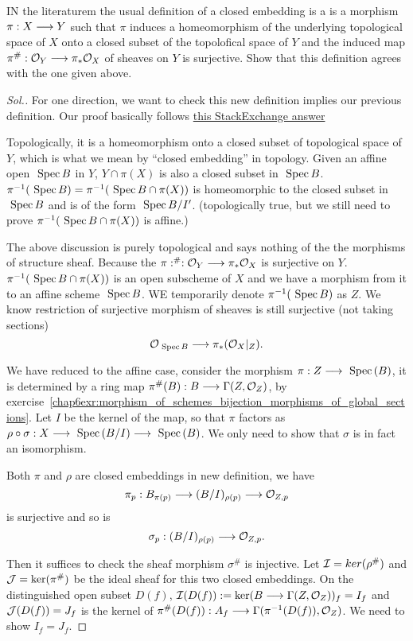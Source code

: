 \documentclass[11pt]{book} %
\begin{document}
\begin{exr} 
IN the literaturem the usual definition of a closed embedding is a is a morphism $\pi:X\longrightarrow Y$ such that $\pi$ induces a homeomorphism of the underlying topological space of $X$ onto a closed subset of the topolofical space of $Y$ and the induced map $\pi^\#:{\cal O}_Y\longrightarrow \pi_*{\cal O}_X$ of sheaves on $Y$ is surjective. Show that this definition agrees with the one given above.
\end{exr}
\begin{proof}[Sol.]
For one direction, we want to check this new definition implies our previous definition. Our proof basically follows \href{https://math.stackexchange.com/a/1722514/286862}{this StackExchange answer}

Topologically, it is a homeomorphism onto a closed subset of topological space of $Y$, which is what we mean by ``closed embedding'' in topology. Given an affine open $\text{ Spec\,} B$ in $Y$, $Y\cap \pi(X)$ is also a closed subset in $\text{ Spec\,} B$.  $\pi^{-1}(\text{ Spec\,} B)=\pi^{-1}(\text{ Spec\,} B\cap \pi(X))$ is homeomorphic to the closed subset in $\text{ Spec\,} B$ and is of the form $\text{ Spec\,} B/I'$. (topologically true, but we still need to prove $\pi^{-1}(\text{ Spec\,} B\cap \pi(X))$ is affine.)

The above discussion is purely topological and says nothing of the the morphisms of structure sheaf. Because the $\pi:^\#:{\cal O}_Y\longrightarrow \pi_*{\cal O}_X$ is surjective on $Y$.  $\pi^{-1}(\text{ Spec\,} B\cap \pi(X))$ is an open subscheme of $X$ and we have a morphism from it to an affine scheme $\text{ Spec\,} B$. WE temporarily denote $\pi^{-1}(\text{ Spec\,} B)$ as $Z$. We know restriction of surjective morphism  of sheaves is still surjective (not taking sections)
$$
{\cal O}_{\text{ Spec\,} B}\longrightarrow \pi_*({\cal O}_{X}|_{Z}).
$$ 

We have reduced to the affine case, consider the morphism $\pi:Z\longrightarrow \text{ Spec\,}(B)$, it is determined by a ring map $\pi^\#(B):B\longrightarrow \Gamma(Z,{\cal O}_Z)$, by exercise~\ref{chap6exr:morphism_of_schemes_bijection_morphisms_of_global_sections}. Let $I$ be the kernel of the map, so that $\pi$ factors as $\rho\circ \sigma:X\longrightarrow\text{ Spec\,}(B/I)\longrightarrow \text{ Spec\,}(B)$. We only need to show that $\sigma$ is in fact an isomorphism. 

Both $\pi$ and $\rho$ are closed embeddings in new definition, we have 
$$
\pi_p:B_{\pi(p)}\longrightarrow (B/I)_{\rho(p)}\longrightarrow {\cal O}_{Z,p}
$$
is surjective and so is
$$
\sigma_p:(B/I)_{\rho(p)}\longrightarrow {\cal O}_{Z,p}.
$$

Then it suffices to check the sheaf morphism $\sigma^\#$  is injective. Let ${\cal I}=ker(\rho^\#)$ and ${\cal J}=\ker(\pi^\#)$ be the ideal sheaf for this two closed embeddings. 
On the distinguished open subset $D(f)$, ${\cal I}(D(f)):=\ker(B\longrightarrow \Gamma(Z,{\cal O}_Z))_{f}=I_f$ and ${\cal J}(D(f))=J_f$ is the kernel of $\pi^\#(D(f)):A_f\longrightarrow \Gamma(\pi^{-1}(D(f)),{\cal O}_Z)$. We need to show $I_f=J_f$.  


\end{proof}
\end{document}
